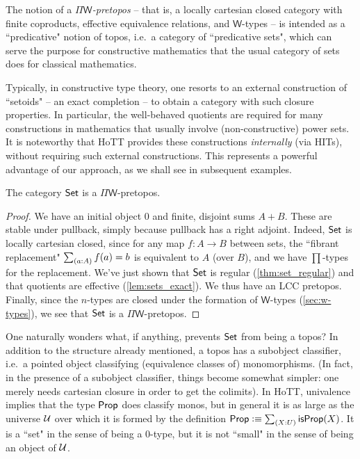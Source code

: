 The notion of a \emph{$\Pi\mathsf{W}$-pretopos} -- that is, a locally cartesian closed category with finite coproducts, effective equivalence relations, and $\mathsf{W}$-types -- is intended as a ``predicative" notion of topos, i.e.\ a category of ``predicative sets", which can serve the purpose for constructive mathematics that the usual category of sets does for classical mathematics.  

Typically, in constructive type theory, one resorts to an external construction of ``setoids" -- an exact completion -- to obtain a category with such closure properties.  In particular, the well-behaved quotients are required for many constructions in mathematics that usually involve (non-constructive) power sets.  It is noteworthy that HoTT  provides these constructions \emph{internally} (via HITs), without requiring such external constructions.  This represents a powerful advantage of our approach, as we shall see in subsequent examples.

\begin{thm} The category $\mathsf{Set}$ is a $\Pi\mathsf{W}$-pretopos.
\end{thm}
\begin{proof}
We have an initial object $0$ and finite, disjoint sums $A+B$.  These are stable under pullback, simply because pullback has a right adjoint.  Indeed, $\mathsf{Set}$ is locally cartesian closed, since for any map $f:A\to B$ between sets, the ``fibrant replacement" $\sm{a:A}f(a)=b$ is equivalent to $A$ (over $B$), and we have $\prod$-types for the replacement.
We've just shown that $\mathsf{Set}$ is regular (\autoref{thm:set_regular}) and that quotients are effective (\autoref{lem:sets_exact}). We thus have an LCC pretopos. Finally, since the $n$-types are closed under the formation of $\mathsf{W}$-types
(\autoref{sec:w-types}), we see that $\mathsf{Set}$ is a $\Pi\mathsf{W}$-pretopos. 
\end{proof}

One naturally wonders what, if anything, prevents $\mathsf{Set}$ from being a topos? In addition to the structure already mentioned, a topos has a subobject classifier, i.e.\ a pointed object classifying (equivalence classes of) monomorphisms.  (In fact, in the presence of a subobject classifier, things become somewhat simpler: one merely needs cartesian closure in order to get the colimits).  In HoTT,  univalence implies that the type $\mathsf{Prop}$ does classify monos, but in general it is as large as the universe $\mathcal{U}$ over which it is formed by the definition $\prop \defeq \sm{X:U}\isprop(X)$. It is a ``set" in the sense of being a $0$-type, but it is not ``small" in the sense of being an object of $\mathcal{U}$.

